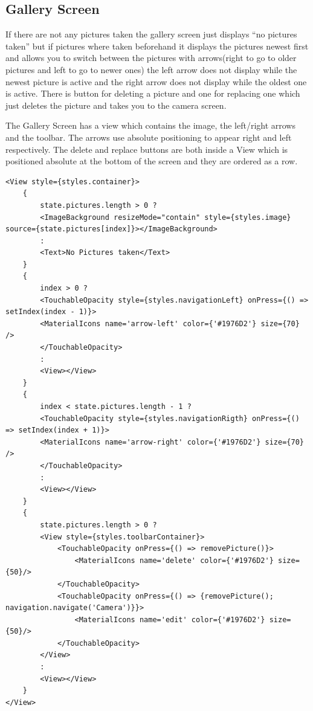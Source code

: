 \subsection{Gallery Screen}

If there are not any pictures taken the gallery screen just displays ``no pictures taken'' but if pictures where taken beforehand
it displays the pictures newest first and allows you to switch between the pictures with arrows(right to go to older pictures and left to go to newer ones)
the left arrow does not display while the newest picture is active and the right arrow does not display while the oldest one is active.
There is button for deleting a picture and one for replacing one which just deletes the picture and takes you to the camera screen.

The Gallery Screen has a view which contains the image, the left/right arrows and the toolbar.
The arrows use absolute positioning to appear right and left respectively.
The delete and replace buttons are both inside a View which is positioned absolute at the bottom of the screen and they are ordered as a row.


\begin{lstlisting}[caption=Gallary Screen display code,label=lst:impl:galleryScreenDisplay]
<View style={styles.container}>
    {
        state.pictures.length > 0 ? 
        <ImageBackground resizeMode="contain" style={styles.image} source={state.pictures[index]}></ImageBackground> 
        :
        <Text>No Pictures taken</Text>
    }
    {
        index > 0 ? 
        <TouchableOpacity style={styles.navigationLeft} onPress={() => setIndex(index - 1)}>
        <MaterialIcons name='arrow-left' color={'#1976D2'} size={70} />
        </TouchableOpacity>
        :
        <View></View>
    }
    {
        index < state.pictures.length - 1 ?
        <TouchableOpacity style={styles.navigationRigth} onPress={() => setIndex(index + 1)}>
        <MaterialIcons name='arrow-right' color={'#1976D2'} size={70} />
        </TouchableOpacity>
        :
        <View></View>
    }
    {
        state.pictures.length > 0 ?
        <View style={styles.toolbarContainer}>
            <TouchableOpacity onPress={() => removePicture()}>
                <MaterialIcons name='delete' color={'#1976D2'} size={50}/>
            </TouchableOpacity>
            <TouchableOpacity onPress={() => {removePicture(); navigation.navigate('Camera')}}>
                <MaterialIcons name='edit' color={'#1976D2'} size={50}/>
            </TouchableOpacity>
        </View>
        :
        <View></View>
    }
</View>
\end{lstlisting}

